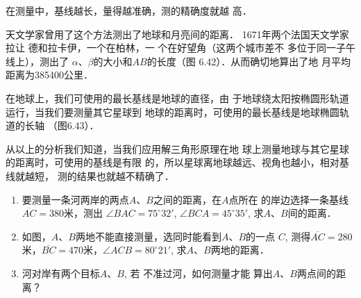 在测量中，基线越长，量得越准确，测的精确度就越
高．

天文学家曾用了这个方法测出了地球和月亮间的距离．
1671年两个法国天文学家拉让
德和拉卡伊，一个在柏林，一
个在好望角（这两个城市差不
多位于同一子午线上），测出了
$\alpha$、$\beta$的大小和$AB$的长度（图
6.42）．从而确切地算出了地
月平均距离为385400公里．

在地球上，我们可使用的最长基线是地球的直径，由
于地球绕太阳按椭圆形轨道运行，当我们要测量其它星球到
地球的距离时，可使用的最长基线是地球椭圆轨道的长轴
（图6.43）．

\begin{figure}[htp]
    \centering
\caption{}
\end{figure}

从以上的分析我们知道，当我们应用解三角形原理在地
球上测量地球与其它星球的距离时，可使用的基线是有限
的，所以星球离地球越远、视角也越小，相对基线就越短，
测的结果也就越不精确了．

\begin{ex}
\begin{enumerate}
    \item 要测量一条河两岸的两点$A$、$B$之间的距离，在$A$点所在
    的岸边选择一条基线$\overline{AC}=380$米，测出
    $\angle BAC=75^{\circ}32'$, $\angle BCA=45^{\circ}35'$, 
    求$A$、$B$间的距离．
    \item 如图，$A$、$B$两地不能直接测量，选同时能看到$A$、$B$的一点
    $C$, 测得$\overline{AC}=280$米，$\overline{BC}=470$米，$\angle ACB=80^{\circ}21'$, 
    求$A$、$B$两地的距离．
    \item 河对岸有两个目标$A$、$B$, 若
    不准过河，如何测量才能
    算出$A$、$B$两点间的距离？
\end{enumerate}
\end{ex}

